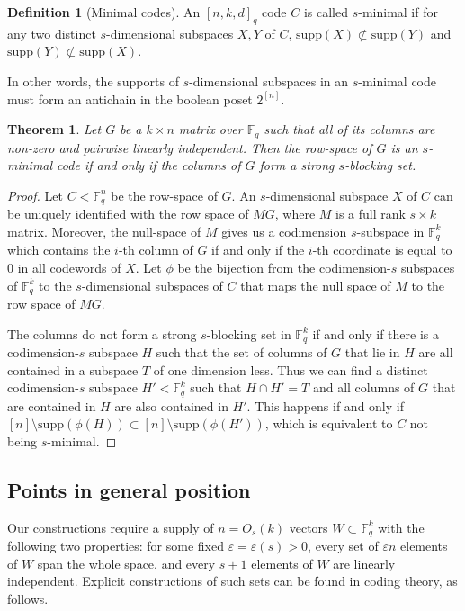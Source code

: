 \documentclass[11pt]{article}
\theoremstyle{plain}
\newtheorem{theorem}{Theorem}
\theoremstyle{definition}
\newtheorem{definition}{Definition}
\begin{document}
\begin{definition}[Minimal codes]
An $[n, k, d]_q$ code $C$ is called $s$-minimal if for any two distinct $s$-dimensional subspaces $X, Y$ of $C$, $\mathrm{supp}(X) \not\subset \mathrm{supp}(Y)$ and $\mathrm{supp}(Y) \not\subset \mathrm{supp}(X)$.
\end{definition}

In other words, the supports of $s$-dimensional subspaces in an $s$-minimal code must form an antichain in the boolean poset $2^{[n]}$. 

\begin{theorem}
Let $G$ be a $k \times n$ matrix over $\mathbb{F}_q$ such that all of its columns are non-zero and pairwise linearly independent. 
Then the row-space of $G$ is an $s$-minimal code if and only if the columns of $G$ form a strong $s$-blocking set. 
\end{theorem}
\begin{proof}
   Let $C<\mathbb{F}_q^n$ be the row-space of $G$. An $s$-dimensional subspace $X$ of $C$ can be uniquely identified with the row space of $M G$, where $M$ is a full rank $s \times k$ matrix. 
    Moreover, the null-space of $M$ gives us a codimension $s$-subspace in $\mathbb{F}_q^k$ which contains the $i$-th column of $G$ if and only if the $i$-th coordinate is equal to $0$ in all codewords of $X$. 
    Let $\phi$ be the bijection from the codimension-$s$ subspaces of $\mathbb{F}_q^k$ to the $s$-dimensional subspaces of $C$ that maps the null space of $M$ to the row space of $MG$. 
    
    The columns do not form a strong $s$-blocking set in $\mathbb{F}_q^k$ if and only if there is a codimension-$s$ subspace $H$ such that the set of columns of $G$ that lie in $H$ are all contained in a subspace $T$ of one dimension less.
    Thus we can find a distinct codimension-$s$ subspace $H'<\mathbb{F}_q^k$ such that $H \cap H' = T$ and all columns of $G$ that are contained in $H$ are also contained in $H'$. 
    This happens if and only if $[n] \setminus \mathrm{supp}(\phi(H)) \subset [n] \setminus \mathrm{supp}(\phi(H'))$, which is equivalent to $C$ not being $s$-minimal. 
\end{proof}

\subsection{Points in general position}

Our constructions require a supply of $n=O_s(k)$ vectors  $W\subset \mathbb{F}_q^k$ with the following two properties: for some fixed $\varepsilon=\varepsilon(s)>0$, every set of $\varepsilon n$ elements of $W$ span the whole space, and every $s+1$ elements of $W$ are linearly independent. Explicit constructions of such sets can be found in coding theory, as follows. 
\end{document}
